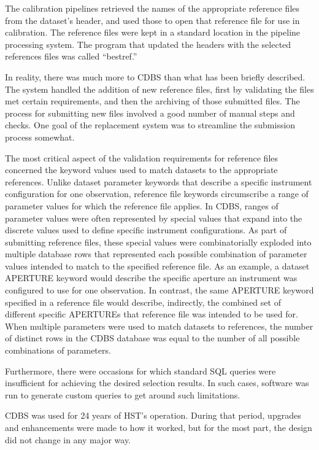 \documentclass[final,authoryear,5p,times,twocolumn]{elsarticle}
\begin{document}
The calibration pipelines retrieved the names of the appropriate reference
files from the dataset's header, and used those to open that reference file
for use in calibration. The reference files were kept in a standard location in
the pipeline processing system. The program that updated the headers with the
selected references files was called ``bestref.''

In reality, there was much more to CDBS than what has been briefly
described. The system handled the addition of new reference files, first by
validating the files met certain requirements, and then the archiving of those
submitted files. The process for submitting new files involved a good number of
manual steps and checks. One goal of the replacement system was to streamline
the submission process somewhat.

The most critical aspect of the validation requirements for reference files
concerned the keyword values used to match datasets to the appropriate
references.  Unlike dataset parameter keywords that describe a specific
instrument configuration for one observation, reference file keywords
circumscribe a range of parameter values for which the reference file applies.
In CDBS, ranges of parameter values were often represented by special values
that expand into the discrete values used to define specific instrument
configurations.  As part of submitting reference files, these special values
were combinatorially exploded into multiple database rows that represented each
possible combination of parameter values intended to match to the specified
reference file.  As an example, a dataset APERTURE keyword would describe the
specific aperture an instrument was configured to use for one observation. In
contrast, the same APERTURE keyword specified in a reference file would
describe, indirectly, the combined set of different specific APERTUREs that
reference file was intended to be used for.  When multiple parameters were used
to match datasets to references, the number of distinct rows in the CDBS
database was equal to the number of all possible combinations of parameters.

Furthermore, there were occasions for which standard SQL queries were
insufficient for achieving the desired selection results. In such cases,
software was run to generate custom queries to get around such limitations.

CDBS was used for 24 years of HST's operation. During that period, upgrades and
enhancements were made to how it worked, but for the most part, the design did
not change in any major way.
\end{document}
